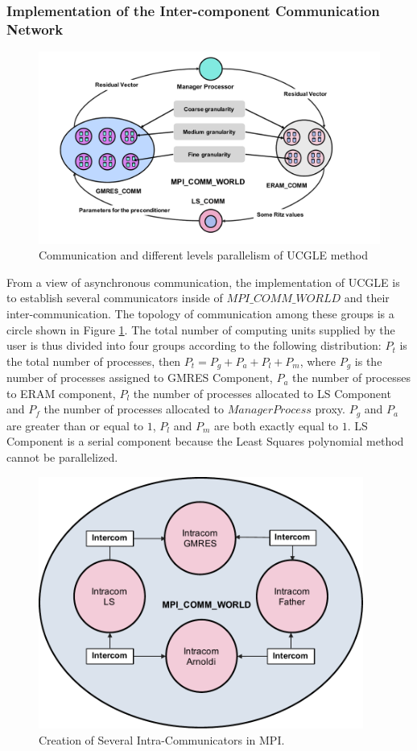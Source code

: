 \subsubsection{Implementation of the Inter-component Communication Network}

\begin{figure}[t]
	\centering
	\includegraphics[width=5.2in]{fig/GLSA_MPI.pdf}
	\caption{Communication and different levels parallelism of UCGLE method}
	\label{fig:glsa_mpi}
\end{figure}

From a view of asynchronous communication, the implementation of UCGLE is to establish several communicators inside of $MPI\_COMM\_WORLD$ and their inter-communication. The topology of communication among these groups is a circle shown in Figure \ref{fig:glsa_mpi}. The total number of computing units supplied by the user is thus divided into four groups according to the following distribution: $P_t$ is the total number of processes, then $P_t = P_g + P_a + P_l + P_m$, where $P_g$ is the number of processes assigned to GMRES Component, $P_a$ the number of processes to ERAM component, $P_l$ the number of processes allocated to LS Component and $P_f$ the number of processes allocated to $Manager Process$ proxy. $P_g$ and $P_a$ are greater than or equal to $1$, $P_l$ and $P_m$ are both exactly equal to $1$. LS Component is a serial component because the Least Squares polynomial method cannot be parallelized.

\begin{figure}
	\centering
	\includegraphics[width=4.2in]{fig/UCGLE_COMM_WORLD.pdf}
	\caption{Creation of Several Intra-Communicators in MPI.}
	\label{fig:ucgle_comm_world}
\end{figure}


